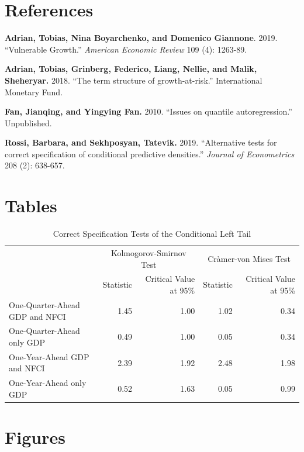 \documentclass[11pt,]{article}
\begin{document}
\hypertarget{references}{%
\section{References}\label{references}}

\textbf{Adrian, Tobias, Nina Boyarchenko, and Domenico Giannone}. 2019.
``Vulnerable Growth.'' \emph{American Economic Review} 109 (4): 1263-89.

\textbf{Adrian, Tobias, Grinberg, Federico, Liang, Nellie, and Malik,
Sheheryar.} 2018. ``The term structure of growth-at-risk.''
International Monetary Fund.

\textbf{Fan, Jianqing, and Yingying Fan.} 2010. ``Issues on quantile
autoregression.'' Unpublished.

\textbf{Rossi, Barbara, and Sekhposyan, Tatevik.} 2019. ``Alternative
tests for correct specification of conditional predictive densities.''
\emph{Journal of Econometrics} 208 (2): 638-657.

\newpage

\hypertarget{tables}{%
\section{Tables}\label{tables}}

\begin{longtable}{lrrrr}
\caption{\label{tab:table1}Correct Specification Tests of the Conditional Left Tail}\\
\toprule
\multicolumn{1}{c}{ } & \multicolumn{2}{c}{Kolmogorov-Smirnov Test} & \multicolumn{2}{c}{Cràmer-von Mises Test} \\
\cmidrule(l{3pt}r{3pt}){2-3} \cmidrule(l{3pt}r{3pt}){4-5}
  & Statistic & Critical Value at 95\% & Statistic & Critical Value at 95\%\\
\midrule
One-Quarter-Ahead GDP and NFCI & 1.45 & 1.00 & 1.02 & 0.34\\
One-Quarter-Ahead only GDP & 0.49 & 1.00 & 0.05 & 0.34\\
One-Year-Ahead GDP and NFCI & 2.39 & 1.92 & 2.48 & 1.98\\
One-Year-Ahead only GDP & 0.52 & 1.63 & 0.05 & 0.99\\
\bottomrule
\end{longtable}

\newpage

\hypertarget{figures}{%
\section{Figures}\label{figures}}
\end{document}

